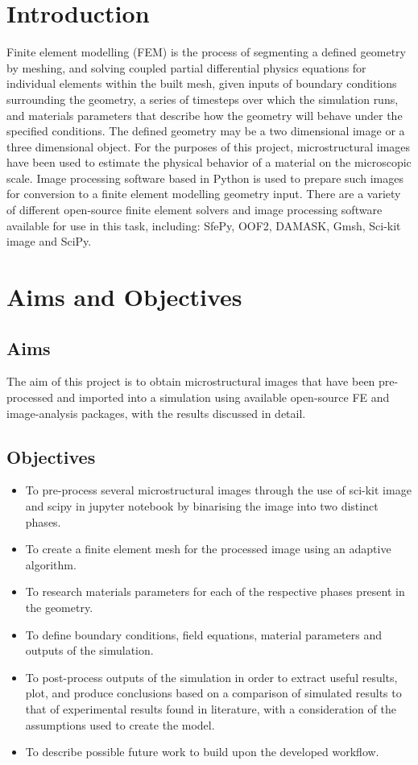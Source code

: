 \documentclass[\report.tex]{subfiles}
\begin{document}
\section{Introduction}
Finite element modelling (FEM) is the process of segmenting a defined geometry by meshing, and solving coupled partial differential physics equations for individual elements within the built mesh, given inputs of boundary conditions surrounding the geometry, a series of timesteps over which the simulation runs, and materials parameters that describe how the geometry will behave under the specified conditions. The defined geometry may be a two dimensional image or a three dimensional object. For the purposes of this project, microstructural images have been used to estimate the physical behavior of a material on the microscopic scale. Image processing software based in Python is used to prepare such images for conversion to a finite element modelling geometry input. There are a variety of different open-source finite element solvers and image processing software available for use in this task, including: SfePy, OOF2, DAMASK, Gmsh, Sci-kit image and SciPy.

\section{Aims and Objectives}
\subsection{Aims}

\noindent The aim of this project is to obtain microstructural images that have been pre-processed and imported into a simulation using available open-source FE and image-analysis packages, with the results discussed in detail.

\subsection{Objectives}

\begin{itemize}
  \item To pre-process several microstructural images through the use of sci-kit image and scipy in jupyter notebook by binarising the image into two distinct phases.
  \item To create a finite element mesh for the processed image using an adaptive algorithm.
  \item To research materials parameters for each of the respective phases present in the geometry.
  \item To define boundary conditions, field equations, material parameters and outputs of the simulation.
  \item To post-process outputs of the simulation in order to extract useful results, plot, and produce conclusions based on a comparison of simulated results to that of experimental results found in literature, with a consideration of the assumptions used to create the model.
  \item To describe possible future work to build upon the developed workflow.
\end{itemize}
\end{document}
